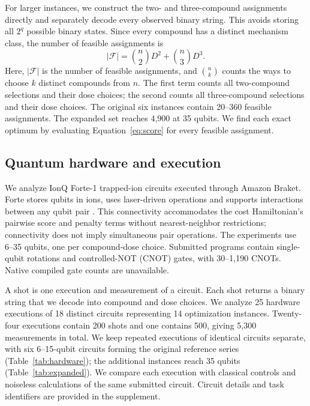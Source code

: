 \documentclass[utf8]{FrontiersinHarvard}
\newcommand{\Fset}{\mathcal{F}}
\begin{document}
For larger instances, we construct the two- and three-compound assignments directly and separately decode every observed binary string. This avoids storing all $2^q$ possible binary states. Since every compound has a distinct mechanism class, the number of feasible assignments is
\begin{equation}
 |\Fset|=\binom{n}{2}D^2+\binom{n}{3}D^3.
 \label{eq:count}
\end{equation}
Here, $|\Fset|$ is the number of feasible assignments, and $\binom{n}{k}$ counts the ways to choose $k$ distinct compounds from $n$. The first term counts all two-compound selections and their dose choices; the second counts all three-compound selections and their dose choices. The original six instances contain 20--360 feasible assignments. The expanded set reaches 4,900 at 35 qubits. We find each exact optimum by evaluating Equation~\ref{eq:score} for every feasible assignment.

\subsection{Quantum hardware and execution}
We analyze IonQ Forte-1 trapped-ion circuits executed through Amazon Braket. Forte stores qubits in ions, uses laser-driven operations and supports interactions between any qubit pair \citep{chen2024}. This connectivity accommodates the cost Hamiltonian's pairwise score and penalty terms without nearest-neighbor restrictions; connectivity does not imply simultaneous pair operations. The experiments use 6--35 qubits, one per compound-dose choice. Submitted programs contain single-qubit rotations and controlled-NOT (CNOT) gates, with 30--1,190 CNOTs. Native compiled gate counts are unavailable.

A shot is one execution and measurement of a circuit. Each shot returns a binary string that we decode into compound and dose choices. We analyze 25 hardware executions of 18 distinct circuits representing 14 optimization instances. Twenty-four executions contain 200 shots and one contains 500, giving 5,300 measurements in total. We keep repeated executions of identical circuits separate, with six 6--15-qubit circuits forming the original reference series (Table~\ref{tab:hardware}); the additional instances reach 35 qubits (Table~\ref{tab:expanded}). We compare each execution with classical controls and noiseless calculations of the same submitted circuit. Circuit details and task identifiers are provided in the supplement.
\end{document}
